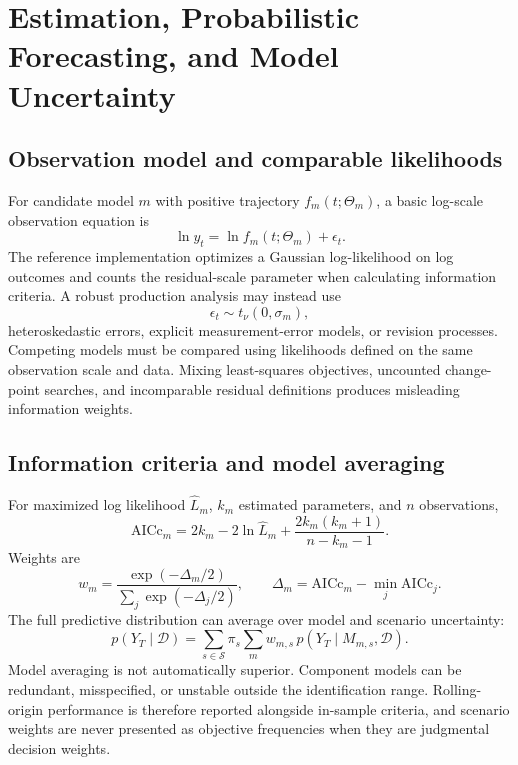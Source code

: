 \section{Estimation, Probabilistic Forecasting, and Model Uncertainty}

\subsection{Observation model and comparable likelihoods}

For candidate model $m$ with positive trajectory $f_m(t;\Theta_m)$, a basic log-scale observation equation is
\begin{equation}
\ln y_t=\ln f_m(t;\Theta_m)+\epsilon_t.
\end{equation}
The reference implementation optimizes a Gaussian log-likelihood on log outcomes and counts the residual-scale parameter when calculating information criteria. A robust production analysis may instead use
\begin{equation}
\epsilon_t\sim t_\nu(0,\sigma_m),
\end{equation}
heteroskedastic errors, explicit measurement-error models, or revision processes. Competing models must be compared using likelihoods defined on the same observation scale and data. Mixing least-squares objectives, uncounted change-point searches, and incomparable residual definitions produces misleading information weights.

\subsection{Information criteria and model averaging}

For maximized log likelihood $\hat L_m$, $k_m$ estimated parameters, and $n$ observations,
\begin{equation}
\mathrm{AICc}_m=2k_m-2\ln\hat L_m+\frac{2k_m(k_m+1)}{n-k_m-1}.
\end{equation}
Weights are
\begin{equation}
w_m=\frac{\exp(-\Delta_m/2)}{\sum_j\exp(-\Delta_j/2)},\qquad
\Delta_m=\mathrm{AICc}_m-\min_j\mathrm{AICc}_j.
\end{equation}
The full predictive distribution can average over model and scenario uncertainty:
\begin{equation}
\label{eq:model-scenario-average}
p(Y_T\mid\mathcal D)=\sum_{s\in\mathcal S}\pi_s\sum_mw_{m,s}\,p(Y_T\mid M_{m,s},\mathcal D).
\end{equation}
Model averaging is not automatically superior. Component models can be redundant, misspecified, or unstable outside the identification range. Rolling-origin performance is therefore reported alongside in-sample criteria, and scenario weights are never presented as objective frequencies when they are judgmental decision weights.

